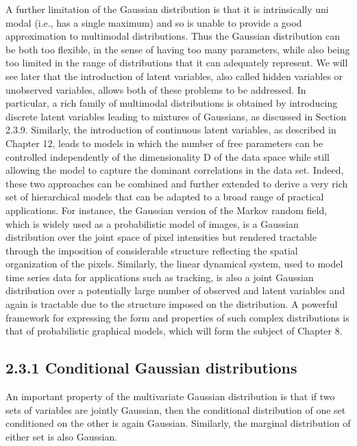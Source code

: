 \documentclass[
  10
]{article}
\begin{document}
A further limitation of the Gaussian distribution is that it is
intrinsically uni modal (i.e., has a single maximum) and so is unable to
provide a good approximation to multimodal distributions. Thus the
Gaussian distribution can be both too flexible, in the sense of having
too many parameters, while also being too limited in the range of
distributions that it can adequately represent. We will see later that
the introduction of latent variables, also called hidden variables or
unobserved variables, allows both of these problems to be addressed. In
particular, a rich family of multimodal distributions is obtained by
introducing discrete latent variables leading to mixtures of Gaussians,
as discussed in Section 2.3.9. Similarly, the introduction of continuous
latent variables, as described in Chapter 12, leads to models in which
the number of free parameters can be controlled independently of the
dimensionality D of the data space while still allowing the model to
capture the dominant correlations in the data set. Indeed, these two
approaches can be combined and further extended to derive a very rich
set of hierarchical models that can be adapted to a broad range of
practical applications. For instance, the Gaussian version of the Markov
random field, which is widely used as a probabilistic model of images,
is a Gaussian distribution over the joint space of pixel intensities but
rendered tractable through the imposition of considerable structure
reflecting the spatial organization of the pixels. Similarly, the linear
dynamical system, used to model time series data for applications such
as tracking, is also a joint Gaussian distribution over a potentially
large number of observed and latent variables and again is tractable due
to the structure imposed on the distribution. A powerful framework for
expressing the form and properties of such complex distributions is that
of probabilistic graphical models, which will form the subject of
Chapter 8.

\subsection{2.3.1 Conditional Gaussian
distributions}\label{conditional-gaussian-distributions}

An important property of the multivariate Gaussian distribution is that
if two sets of variables are jointly Gaussian, then the conditional
distribution of one set conditioned on the other is again Gaussian.
Similarly, the marginal distribution of either set is also Gaussian.
\end{document}
